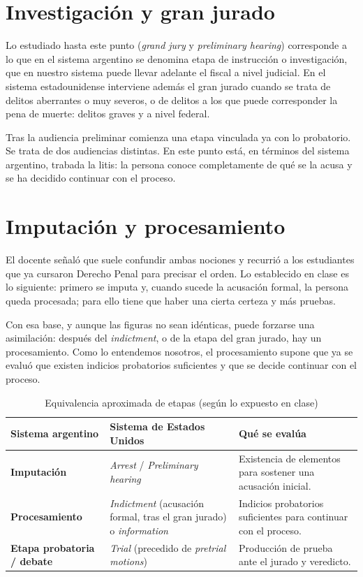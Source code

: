 \documentclass[12pt,oneside]{book}
\begin{document}
\section{Investigación y gran jurado}

Lo estudiado hasta este punto (\textit{grand jury} y \textit{preliminary hearing}) corresponde a lo que en el sistema argentino se denomina etapa de instrucción o investigación, que en nuestro sistema puede llevar adelante el fiscal a nivel judicial. En el sistema estadounidense interviene además el gran jurado cuando se trata de delitos aberrantes o muy severos, o de delitos a los que puede corresponder la pena de muerte: delitos graves y a nivel federal.

Tras la audiencia preliminar comienza una etapa vinculada ya con lo probatorio. Se trata de dos audiencias distintas. En este punto está, en términos del sistema argentino, trabada la litis: la persona conoce completamente de qué se la acusa y se ha decidido continuar con el proceso.

\section{Imputación y procesamiento}

El docente señaló que suele confundir ambas nociones y recurrió a los estudiantes que ya cursaron Derecho Penal para precisar el orden. Lo establecido en clase es lo siguiente: primero se imputa y, cuando sucede la acusación formal, la persona queda procesada; para ello tiene que haber una cierta certeza y más pruebas.

Con esa base, y aunque las figuras no sean idénticas, puede forzarse una asimilación: después del \textit{indictment}, o de la etapa del gran jurado, hay un procesamiento. Como lo entendemos nosotros, el procesamiento supone que ya se evaluó que existen indicios probatorios suficientes y que se decide continuar con el proceso.

\begin{table}[H]
\centering
\small
\caption{Equivalencia aproximada de etapas (según lo expuesto en clase)}
\begin{tabularx}{\textwidth}{L L L}
\toprule
\textbf{Sistema argentino} & \textbf{Sistema de Estados Unidos} & \textbf{Qué se evalúa} \\
\midrule
\textbf{Imputación} & \textit{Arrest} / \textit{Preliminary hearing} & Existencia de elementos para sostener una acusación inicial. \\
\addlinespace
\textbf{Procesamiento} & \textit{Indictment} (acusación formal, tras el gran jurado) o \textit{information} & Indicios probatorios suficientes para continuar con el proceso. \\
\addlinespace
\textbf{Etapa probatoria / debate} & \textit{Trial} (precedido de \textit{pretrial motions}) & Producción de prueba ante el jurado y veredicto. \\
\bottomrule
\end{tabularx}
\end{table}
\end{document}
